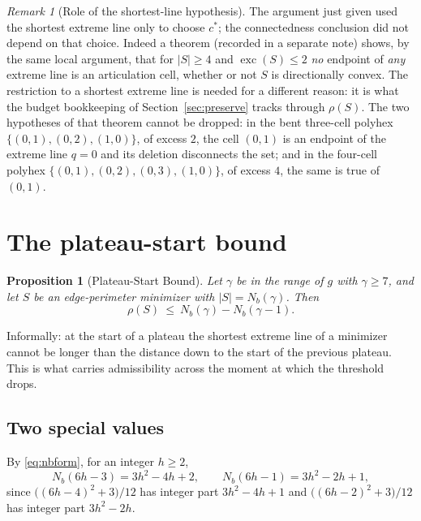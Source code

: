 \documentclass[11pt]{article}
\theoremstyle{plain}
\newtheorem{proposition}[theorem]{Proposition}
\theoremstyle{definition}
\theoremstyle{remark}
\newtheorem{remark}[theorem]{Remark}
\DeclareMathOperator{\exc}{exc}
\begin{document}
\begin{remark}[Role of the shortest-line hypothesis]\label{rem:shortest}
The argument just given used the shortest extreme line only to choose \(c^{*}\); the
connectedness conclusion did not depend on that choice. Indeed a theorem
(recorded in a separate note) shows, by the same local argument, that for \(|S|\ge4\)
and \(\exc(S)\le2\) \emph{no} endpoint of \emph{any} extreme line is an articulation cell,
whether or not \(S\) is directionally convex. The restriction to a shortest extreme line is needed for a
different reason: it is what the budget bookkeeping of Section~\ref{sec:preserve} tracks
through \(\rho(S)\). The two hypotheses of that theorem cannot be dropped: in
the bent three-cell polyhex \(\{(0,1),(0,2),(1,0)\}\), of excess \(2\), the cell \((0,1)\)
is an endpoint of the extreme line \(q=0\) and its deletion disconnects the set; and in the
four-cell polyhex \(\{(0,1),(0,2),(0,3),(1,0)\}\), of excess \(4\), the same is true of
\((0,1)\).
\end{remark}

\section{The plateau-start bound}\label{sec:plateau}

\begin{proposition}[Plateau-Start Bound]\label{pro:plateau}
Let \(\gamma\) be in the range of \(g\) with \(\gamma\ge7\), and let \(S\) be an
edge-perimeter minimizer with \(|S|=N_{b}(\gamma)\). Then
\[
   \rho(S)\ \le\ N_{b}(\gamma)-N_{b}(\gamma-1).
\]
\end{proposition}

Informally: at the start of a plateau the shortest extreme line of a minimizer cannot be
longer than the distance down to the start of the previous plateau. This is what carries
admissibility across the moment at which the threshold drops.

\subsection{Two special values}\label{sec:12.1}

By \eqref{eq:nbform}, for an integer \(h\ge2\),
\begin{equation}\label{eq:nbspecial}
   N_{b}(6h-3)=3h^{2}-4h+2,\qquad N_{b}(6h-1)=3h^{2}-2h+1 ,
\end{equation}
since \(\bigl((6h-4)^{2}+3\bigr)/12\) has integer part \(3h^{2}-4h+1\) and
\(\bigl((6h-2)^{2}+3\bigr)/12\) has integer part \(3h^{2}-2h\).
\end{document}

